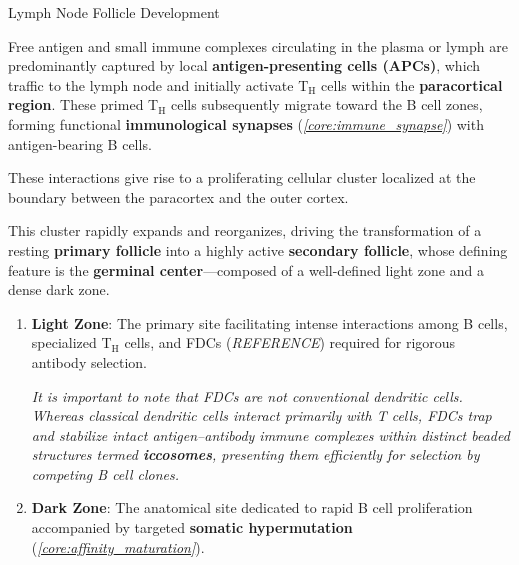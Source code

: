       \begin{core}[label=core:ln_follicle]{Lymph Node Follicle Development}

        Free antigen and small immune complexes circulating in the plasma or lymph are predominantly captured by local \textbf{antigen-presenting cells (APCs)}, which traffic to the lymph node and initially activate T$_\text{H}$ cells within the \textbf{paracortical region}. These primed T$_\text{H}$ cells subsequently migrate toward the B cell zones, forming functional \textbf{immunological synapses} (\textit{\autoref{core:immune_synapse}}) with antigen-bearing B cells.

        These interactions give rise to a proliferating cellular cluster localized at the boundary between the paracortex and the outer cortex.


        This cluster rapidly expands and reorganizes, driving the transformation of a resting \textbf{primary follicle} into a highly active \textbf{secondary follicle}, whose defining feature is the \textbf{germinal center}---composed of a well-defined light zone and a dense dark zone.

        \begin{enumerate}

          \item \textbf{Light Zone}: The primary site facilitating intense interactions among B cells, specialized T$_\text{H}$ cells, and FDCs (\textit{REFERENCE}) required for rigorous antibody selection.

          \textit{It is important to note that FDCs are not conventional dendritic cells. Whereas classical dendritic cells interact primarily with T cells, FDCs trap and stabilize intact antigen--antibody immune complexes within distinct beaded structures termed \textbf{iccosomes}, presenting them efficiently for selection by competing B cell clones.}

          \item \textbf{Dark Zone}: The anatomical site dedicated to rapid B cell proliferation accompanied by targeted \textbf{somatic hypermutation} (\textit{\autoref{core:affinity_maturation}}).

        \end{enumerate}

      \end{core}

